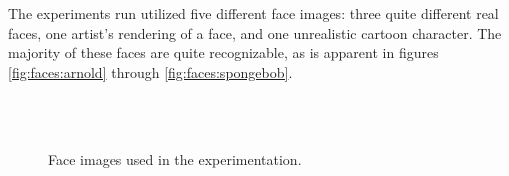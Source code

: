 The experiments run utilized five different face images: three quite different real faces, one artist's rendering of a face, and one unrealistic cartoon character. The majority of these faces are quite recognizable, as is apparent in figures \ref{fig:faces:arnold} through \ref{fig:faces:spongebob}.

\begin{figure}
    \centering
     \\
     \\
    \caption{Face images used in the experimentation.\label{fig:faces}}
\end{figure}

